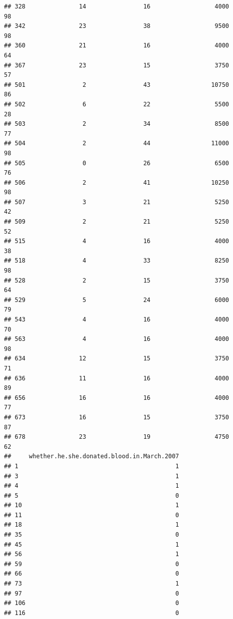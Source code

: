 \documentclass[
]{article}
\begin{document}
\begin{verbatim}
## 328               14                16                  4000            98
## 342               23                38                  9500            98
## 360               21                16                  4000            64
## 367               23                15                  3750            57
## 501                2                43                 10750            86
## 502                6                22                  5500            28
## 503                2                34                  8500            77
## 504                2                44                 11000            98
## 505                0                26                  6500            76
## 506                2                41                 10250            98
## 507                3                21                  5250            42
## 509                2                21                  5250            52
## 515                4                16                  4000            38
## 518                4                33                  8250            98
## 528                2                15                  3750            64
## 529                5                24                  6000            79
## 543                4                16                  4000            70
## 563                4                16                  4000            98
## 634               12                15                  3750            71
## 636               11                16                  4000            89
## 656               16                16                  4000            77
## 673               16                15                  3750            87
## 678               23                19                  4750            62
##     whether.he.she.donated.blood.in.March.2007
## 1                                            1
## 3                                            1
## 4                                            1
## 5                                            0
## 10                                           1
## 11                                           0
## 18                                           1
## 35                                           0
## 45                                           1
## 56                                           1
## 59                                           0
## 66                                           0
## 73                                           1
## 97                                           0
## 106                                          0
## 116                                          0

\end{verbatim}
\end{document}
